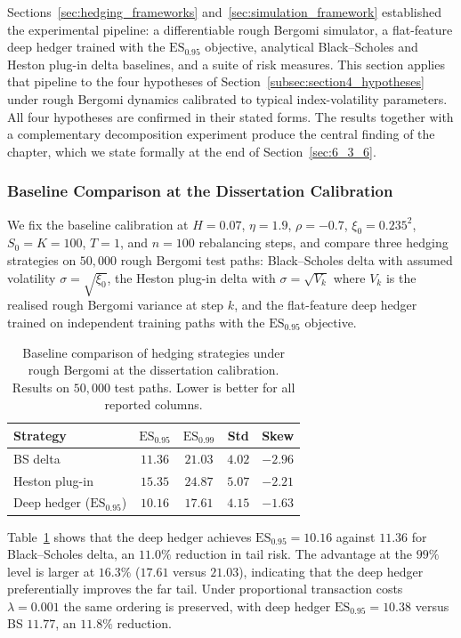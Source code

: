 \documentclass[12pt,a4paper]{article}
\theoremstyle{definition}
\theoremstyle{plain}
\theoremstyle{remark}
\theoremstyle{plain}
\begin{document}
Sections~\ref{sec:hedging_frameworks} and~\ref{sec:simulation_framework}
established the experimental pipeline: a differentiable rough
Bergomi simulator, a flat-feature deep hedger trained with the
$\mathrm{ES}_{0.95}$ objective, analytical Black--Scholes and
Heston plug-in delta baselines, and a suite of risk measures.
This section applies that pipeline to the four hypotheses of
Section~\ref{subsec:section4_hypotheses} under rough Bergomi
dynamics calibrated to typical index-volatility parameters.
All four hypotheses are confirmed in their stated forms.
The results together with a complementary decomposition
experiment produce the central finding of the chapter, which we
state formally at the end of Section~\ref{sec:6_3_6}.

\subsubsection{Baseline Comparison at the Dissertation Calibration}
\label{sec:6_3_1}

We fix the baseline calibration at $H = 0.07$, $\eta = 1.9$,
$\rho = -0.7$, $\xi_0 = 0.235^2$, $S_0 = K = 100$, $T = 1$, and
$n = 100$ rebalancing steps, and compare three hedging strategies
on $50{,}000$ rough Bergomi test paths: Black--Scholes delta with
assumed volatility $\sigma = \sqrt{\xi_0}$, the Heston plug-in
delta with $\sigma = \sqrt{V_k}$ where $V_k$ is the realised rough
Bergomi variance at step $k$, and the flat-feature deep hedger
trained on independent training paths with the $\mathrm{ES}_{0.95}$
objective.

\begin{table}[htbp]
\centering
\caption{Baseline comparison of hedging strategies under rough
Bergomi at the dissertation calibration. Results on $50{,}000$
test paths. Lower is better for all reported columns.}
\label{tab:6_3_baseline}
\begin{tabular}{lcccc}
\toprule
Strategy & $\mathrm{ES}_{0.95}$ & $\mathrm{ES}_{0.99}$ & Std & Skew \\
\midrule
BS delta & $11.36$ & $21.03$ & $4.02$ & $-2.96$ \\
Heston plug-in & $15.35$ & $24.87$ & $5.07$ & $-2.21$ \\
Deep hedger ($\mathrm{ES}_{0.95}$) & $\mathbf{10.16}$ & $\mathbf{17.61}$ & $4.15$ & $\mathbf{-1.63}$ \\
\bottomrule
\end{tabular}
\end{table}

Table~\ref{tab:6_3_baseline} shows that the deep hedger achieves
$\mathrm{ES}_{0.95} = 10.16$ against $11.36$ for Black--Scholes
delta, an $11.0\%$ reduction in tail risk. The advantage at the
$99\%$ level is larger at $16.3\%$ ($17.61$ versus $21.03$),
indicating that the deep hedger preferentially improves the far
tail. Under proportional transaction costs $\lambda = 0.001$ the
same ordering is preserved, with deep hedger
$\mathrm{ES}_{0.95} = 10.38$ versus BS $11.77$, an $11.8\%$
reduction.
\end{document}
